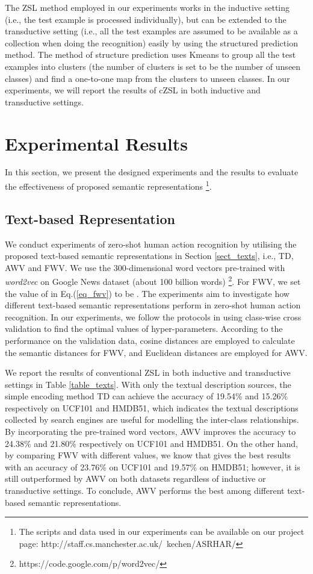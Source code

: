 \documentclass[runningheads,a4paper] {llncs}
\begin{document}
The ZSL method employed in our experiments works in the inductive setting (i.e., the test example is processed individually), but can be extended to the transductive setting (i.e., all the test examples are assumed to be available as a collection when doing the recognition) easily by using the structured prediction method\cite{wang2016zero,zhang2016zero}. The method of structure prediction uses Kmeans to group all the test examples into clusters (the number of clusters is set to be the number of unseen classes) and find a one-to-one map from the clusters to unseen classes. In our experiments, we will report the results of cZSL in both inductive and transductive settings.
 
\section{Experimental Results}
In this section, we present the designed experiments and the results to evaluate the effectiveness of proposed semantic representations \footnote{The scripts and data used in our experiments can be available on our project page: http://staff.cs.manchester.ac.uk/~kechen/ASRHAR/}.

\subsection{Text-based Representation}
\label{sect_texts_results}
We conduct experiments of zero-shot human action recognition by utilising the proposed text-based semantic representations in Section \ref{sect_texts}, i.e., TD, AWV and FWV. We use the 300-dimensional word vectors pre-trained with \textit{word2vec} on Google News dataset (about 100 billion words) \footnote{https://code.google.com/p/word2vec/}. For FWV, we set the value of  in Eq.(\ref{eq_fwv}) to be . The experiments aim to investigate how different text-based semantic representations perform in zero-shot human action recognition. In our experiments, we follow the protocols in \cite{wang2016zero} using class-wise cross validation to find the optimal values of hyper-parameters. According to the performance on the validation data, cosine distances are employed to calculate the semantic distances for FWV, and Euclidean distances are employed for AWV.

We report the results of conventional ZSL in both inductive and transductive settings in Table \ref{table_texts}. With only the textual description sources, the simple encoding method TD can achieve the accuracy of 19.54\% and 15.26\% respectively on UCF101 and HMDB51, which indicates the textual descriptions collected by search engines are useful for modelling the inter-class relationships. By incorporating the pre-trained word vectors, AWV improves the accuracy to 24.38\% and 21.80\% respectively on UCF101 and HMDB51. On the other hand, by comparing FWV with different  values, we know that  gives the best results with an accuracy of 23.76\% on UCF101 and 19.57\% on HMDB51; however, it is still outperformed by AWV on both datasets regardless of inductive or transductive settings. To conclude, AWV performs the best among different text-based semantic representations.
\end{document}
